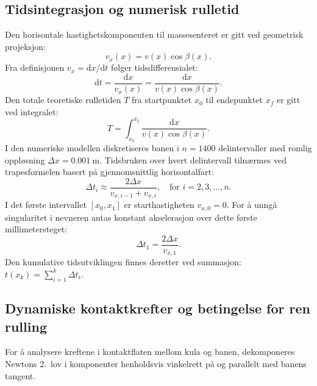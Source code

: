\documentclass[11pt,a4paper]{article}
\begin{document}
\subsection{Tidsintegrasjon og numerisk rulletid}
Den horisontale hastighetskomponenten til massesenteret er gitt ved geometrisk projeksjon:
\begin{equation}
    v_x(x) = v(x)\cos\beta(x).
    \label{eq:vx}
\end{equation}
Fra definisjonen $v_x = \mathrm{d}x/\mathrm{d}t$ følger tidsdifferensialet:
\begin{equation}
    \mathrm{d}t = \frac{\mathrm{d}x}{v_x(x)} = \frac{\mathrm{d}x}{v(x)\cos\beta(x)}.
\end{equation}
Den totale teoretiske rulletiden $T$ fra startpunktet $x_0$ til endepunktet $x_f$ er gitt ved integralet:
\begin{equation}
    T = \int_{x_0}^{x_f} \frac{\mathrm{d}x}{v(x)\cos\beta(x)}.
    \label{eq:tid_integral}
\end{equation}
I den numeriske modellen diskretiseres banen i $n = 1400$ delintervaller med romlig oppløsning $\Delta x = \SI{0,001}{\meter}$. Tidsbruken over hvert delintervall tilnærmes ved trapesformelen basert på gjennomsnittlig horisontalfart:
\begin{equation}
    \Delta t_i \approx \frac{2\Delta x}{v_{x, i-1} + v_{x, i}}, \quad \text{for } i = 2, 3, \dots, n.
    \label{eq:trapezoid}
\end{equation}
I det første intervallet $[x_0, x_1]$ er starthastigheten $v_{x, 0} = 0$. For å unngå singularitet i nevneren antas konstant akselerasjon over dette første millimetersteget:
\begin{equation}
    \Delta t_1 = \frac{2\Delta x}{v_{x, 1}}.
    \label{eq:dt_first}
\end{equation}
Den kumulative tidsutviklingen finnes deretter ved summasjon: $t(x_k) = \sum_{i=1}^k \Delta t_i$.

\subsection{Dynamiske kontaktkrefter og betingelse for ren rulling}
For å analysere kreftene i kontaktflaten mellom kula og banen, dekomponeres Newtons 2.~lov i komponenter henholdsvis vinkelrett på og parallelt med banens tangent.
\end{document}
